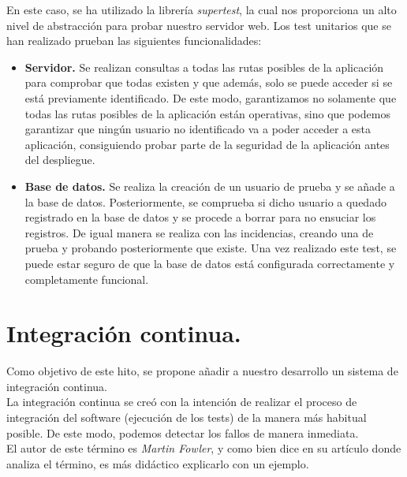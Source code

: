 En este caso, se ha utilizado la librería \textit{supertest}\cite{supertest}, la cual nos proporciona un alto nivel de abstracción para probar nuestro servidor web.
Los test unitarios que se han realizado prueban las siguientes funcionalidades:

\begin{itemize}
	\item \textbf{Servidor.} Se realizan consultas a todas las rutas posibles de la aplicación para comprobar que todas existen y que además, solo se puede acceder 
	si se está previamente identificado. De este modo, garantizamos no solamente que todas las rutas posibles de la aplicación están operativas, sino que podemos garantizar
	que ningún usuario no identificado va a poder acceder a esta aplicación, consiguiendo probar parte de la seguridad de la aplicación antes del despliegue.
	\item \textbf{Base de datos.} Se realiza la creación de un usuario de prueba y se añade a la base de datos. Posteriormente, se comprueba si dicho usuario a quedado registrado
	en la base de datos y se procede a borrar para no ensuciar los registros. De igual manera se realiza con las incidencias, creando una de prueba y probando posteriormente que
	existe. Una vez realizado este test, se puede estar seguro de que la base de datos está configurada correctamente y completamente funcional.
\end{itemize}  

\section{Integración continua.}

Como objetivo de este hito, se propone añadir a nuestro desarrollo un sistema de integración continua.\\

La integración continua se creó con la intención de realizar el proceso de integración del software (ejecución de los tests) de la manera más habitual posible. De este modo, 
podemos detectar los fallos de manera inmediata.\\

El autor de este término es \textit{Martin Fowler}, y como bien dice en su artículo donde analiza el término, es más didáctico explicarlo con un ejemplo.\\

